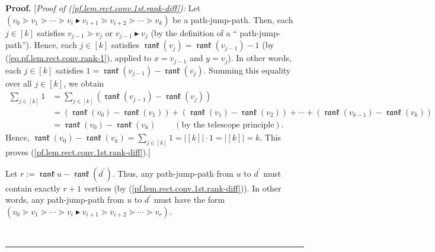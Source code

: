 \documentclass[numbers=enddot,12pt,final,onecolumn,notitlepage]{scrartcl}%
\theoremstyle{definition}
\newenvironment{verlong}{}{}
\newenvironment{vershort}{}{}
\DeclareMathOperator{\rank}{\mathfrak{rank}}
\newenvironment{proof}[1][Proof]{\noindent\textbf{#1.} }{\ \rule{0.5em}{0.5em}}
\let\sumnonlimits\sum
\renewcommand{\sum}{\sumnonlimits\limits}
\begin{document}
\begin{proof}
\begin{verlong}
[\textit{Proof of (\ref{pf.lem.rect.conv.1st.rank-diff}):} Let $\left(
v_{0}\gtrdot v_{1}\gtrdot\cdots\gtrdot v_{i}\blacktriangleright v_{i+1}\gtrdot
v_{i+2}\gtrdot\cdots\gtrdot v_{k}\right)  $ be a path-jump-path. Then, each
$j\in\left[  k\right]  $ satisfies $v_{j-1}\gtrdot v_{j}$ or $v_{j-1}%
\blacktriangleright v_{j}$ (by the definition of a \textquotedblleft
path-jump-path\textquotedblright). Hence, each $j\in\left[  k\right]  $
satisfies $\rank \left(  v_{j}\right)  =\rank \left(  v_{j-1}\right)  -1$ (by
(\ref{eq.pf.lem.rect.conv.rank-1}), applied to $x=v_{j-1}$ and $y=v_{j}$). In
other words, each $j\in\left[  k\right]  $ satisfies $1=\rank \left(
v_{j-1}\right)  -\rank \left(  v_{j}\right)  $. Summing this equality over all
$j\in\left[  k\right]  $, we obtain%
\begin{align*}
\sum_{j\in\left[  k\right]  }1  &  =\sum_{j\in\left[  k\right]  }\left(
\rank \left(  v_{j-1}\right)  -\rank \left(  v_{j}\right)  \right) \\
&  =\left(  \rank \left(  v_{0}\right)  -\rank \left(  v_{1}\right)  \right)
+\left(  \rank \left(  v_{1}\right)  -\rank \left(  v_{2}\right)  \right)
+\cdots+\left(  \rank \left(  v_{k-1}\right)  -\rank \left(  v_{k}\right)
\right) \\
&  =\rank \left(  v_{0}\right)  -\rank \left(  v_{k}\right)
\ \ \ \ \ \ \ \ \ \ \left(  \text{by the telescope principle}\right)  .
\end{align*}
Hence, $\rank \left(  v_{0}\right)  -\rank \left(  v_{k}\right)  =\sum
_{j\in\left[  k\right]  }1=\left\vert \left[  k\right]  \right\vert
\cdot1=\left\vert \left[  k\right]  \right\vert =k$. This proves
(\ref{pf.lem.rect.conv.1st.rank-diff}).]
\end{verlong}

\begin{vershort}
Let $r:=\rank u-\rank \left(  d^{\prime}\right)  $. Thus, any path-jump-path
from $u$ to $d^{\prime}$ must contain exactly $r+1$ vertices (by
(\ref{pf.lem.rect.conv.1st.rank-diff})). In other words, any path-jump-path
from $u$ to $d^{\prime}$ must have the form $\left(  v_{0}\gtrdot v_{1}%
\gtrdot\cdots\gtrdot v_{i}\blacktriangleright v_{i+1}\gtrdot v_{i+2}%
\gtrdot\cdots\gtrdot v_{r}\right)  $.
\end{vershort}


\end{proof}
\end{document}
